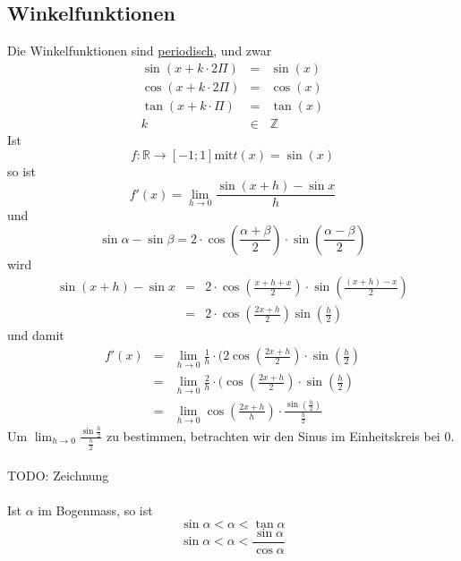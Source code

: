 \documentclass{report}
\newcommand{\Z}{{\mathbb Z}}
\newcommand{\R}{{\mathbb R}}
\begin{document}
\subsection{Winkelfunktionen}
Die Winkelfunktionen sind \underline{periodisch}, und zwar
\begin{eqnarray*}
	\sin(x+k\cdot2\Pi) &=& \sin(x)\\
	\cos(x+k\cdot2\Pi) &=& \cos(x)\\
	\tan(x + k\cdot \Pi) &=& \tan(x)\\
	k &\in& \Z
\end{eqnarray*}
Ist 
\begin{equation*}f: \R \to [-1;1] \text{mit} t(x) = \sin(x)\end{equation*}
so ist
\begin{equation*}f'(x) = \lim_{h \to 0}\frac{\sin(x+h) - \sin x}{h}\end{equation*}
und
\begin{equation*}\sin \alpha - \sin \beta = 2 \cdot \cos(\frac{\alpha + \beta}{2}) \cdot \sin(\frac{\alpha - \beta}{2})\end{equation*}
wird
\begin{eqnarray}\sin(x+h) - \sin x & = & 2 \cdot \cos(\frac{x+h+x}{2}) \cdot \sin(\frac{(x+h)-x}{2}) \nonumber \\
& = & 2 \cdot \cos(\frac{2x + h}{2}) \sin(\frac{h}{2})\end{eqnarray}
und damit
\begin{eqnarray}f'(x) & = & \lim_{h \to 0} \frac{1}{h} \cdot (2\cos(\frac{2x+h}{2}) \cdot \sin(\frac{h}{2}) \nonumber \\
& = & \lim_{h \to 0} \frac{2}{h} \cdot (\cos(\frac{2x+h}{2}) \cdot \sin(\frac{h}{2}) \nonumber \\
& = & \lim_{h \to 0} \cos(\frac{2x + h}{h}) \cdot \frac{\sin(\frac{h}{2})}{\frac{h}{2}}\end{eqnarray}
Um $\lim_{h \to 0} \frac{\sin \frac{h}{2}}{\frac{h}{2}}$ zu bestimmen, betrachten wir den Sinus im Einheitskreis bei $0$.
\\\\TODO: Zeichnung\\\\
Ist $\alpha$ im Bogenmass, so ist
\begin{equation*}\sin \alpha < \alpha < \tan \alpha\end{equation*}
\begin{equation*}\sin \alpha < \alpha < \frac{\sin \alpha}{\cos \alpha}\end{equation*}
\end{document}
